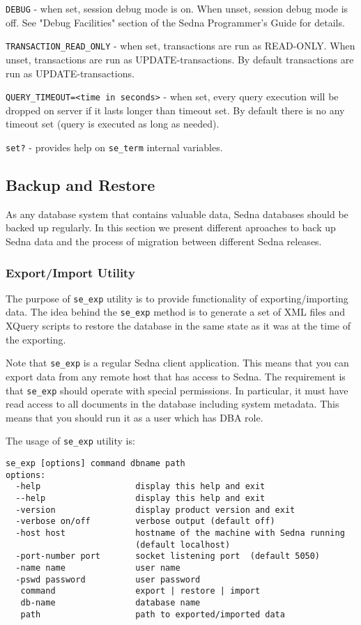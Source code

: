 \documentclass[a4paper,12pt]{article}
\begin{document}
\verb!DEBUG! - when set, session debug mode is on. When unset, session debug mode is off. See "Debug Facilities" section of the Sedna Programmer's Guide for details.

\verb!TRANSACTION_READ_ONLY! - when set, transactions are run as READ-ONLY. When unset, transactions are run as UPDATE-transactions. By default transactions are run as UPDATE-transactions.

\verb!QUERY_TIMEOUT=<time in seconds>! - when set, every query execution will be dropped on server if it lasts longer than timeout set. By default there is no any timeout set (query is executed as long as needed).

\verb!set?! - provides help on \verb!se_term! internal variables.

\subsection{Backup and Restore}

As any database system that contains valuable data, Sedna databases should be backed up regularly.
In this section we present different aproaches to back up Sedna data and the process of 
migration between different Sedna releases.


\subsubsection{Export/Import Utility}

The purpose of \verb!se_exp! utility is to provide functionality of exporting/importing data. The 
idea behind the \verb!se_exp! method is to generate a set of XML files and XQuery 
scripts to restore the database in the same state as it was at the time of the exporting. 

Note that \verb!se_exp! is a regular Sedna client application. This means that you can export data from
any remote host that has access to Sedna. The requirement is that \verb!se_exp! should operate with 
special permissions. In particular, it must have read access to all documents in the database including 
system metadata. This means that you should run it as a user which has DBA role.

The usage of \verb!se_exp! utility is:

\begin{verbatim}
se_exp [options] command dbname path
options:
  -help                   display this help and exit
  --help                  display this help and exit
  -version                display product version and exit
  -verbose on/off         verbose output (default off)
  -host host              hostname of the machine with Sedna running
                          (default localhost)
  -port-number port       socket listening port  (default 5050)
  -name name              user name
  -pswd password          user password
   command                export | restore | import
   db-name                database name
   path                   path to exported/imported data
\end{verbatim}
\end{document}
